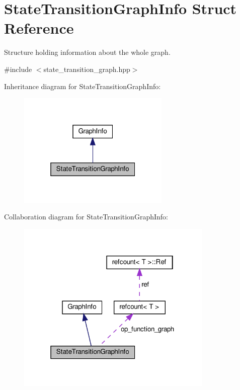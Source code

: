 \hypertarget{structStateTransitionGraphInfo}{}\section{State\+Transition\+Graph\+Info Struct Reference}
\label{structStateTransitionGraphInfo}


Structure holding information about the whole graph.  




{\ttfamily \#include $<$state\+\_\+transition\+\_\+graph.\+hpp$>$}



Inheritance diagram for State\+Transition\+Graph\+Info\+:
\nopagebreak
\begin{figure}[H]
\begin{center}
\leavevmode
\includegraphics[width=205pt]{d8/d6b/structStateTransitionGraphInfo__inherit__graph}
\end{center}
\end{figure}


Collaboration diagram for State\+Transition\+Graph\+Info\+:
\nopagebreak
\begin{figure}[H]
\begin{center}
\leavevmode
\includegraphics[width=265pt]{d5/df6/structStateTransitionGraphInfo__coll__graph}
\end{center}
\end{figure}
